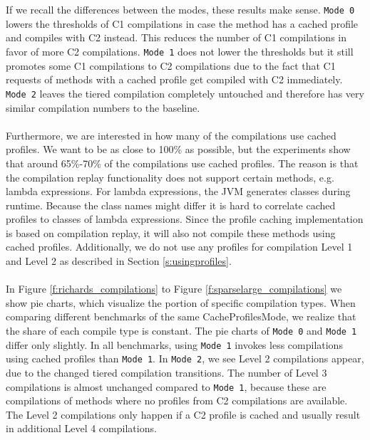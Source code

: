 \\\\
If we recall the differences between the modes, these results make sense. \texttt{Mode 0} lowers the thresholds of C1 compilations in case the method has a cached profile and compiles with C2 instead. This reduces the number of C1 compilations in favor of more C2 compilations. \texttt{Mode 1} does not lower the thresholds but it still promotes some C1 compilations to C2 compilations due to the fact that C1 requests of methods with a cached profile get compiled with C2 immediately.
\texttt{Mode 2} leaves the tiered compilation completely untouched and therefore has very similar compilation numbers to the baseline.
\\\\
Furthermore, we are interested in how many of the compilations use cached profiles. We want to be as close to 100\% as possible, but the experiments show that around 65\%-70\% of the compilations use cached profiles.
The reason is that the compilation replay functionality does not support certain methods, e.g. lambda expressions. For lambda expressions, the JVM generates classes during runtime. Because the class names might differ it is hard to correlate cached profiles to classes of lambda expressions. Since the profile caching implementation is based on compilation replay, it will also not compile these methods using cached profiles. 
Additionally, we do not use any profiles for compilation Level 1 and Level 2 as described in Section \ref{s:usingprofiles}.
\\\\
In Figure \ref{f:richards_compilations} to Figure \ref{f:sparselarge_compilations} we show pie charts, which visualize the portion of specific compilation types.
When comparing different benchmarks of the same CacheProfilesMode, we realize that the share of each compile type is constant.
The pie charts of \texttt{Mode 0} and \texttt{Mode 1} differ only slightly. In all benchmarks, using \texttt{Mode 1} invokes less compilations using cached profiles than \texttt{Mode 1}.
In \texttt{Mode 2}, we see Level 2 compilations appear, due to the changed tiered compilation transitions. The number of Level 3 compilations is almost unchanged compared to \texttt{Mode 1}, because these are compilations of methods where no profiles from C2 compilations are available.
The Level 2 compilations only happen if a C2 profile is cached and usually result in additional Level 4 compilations. 
